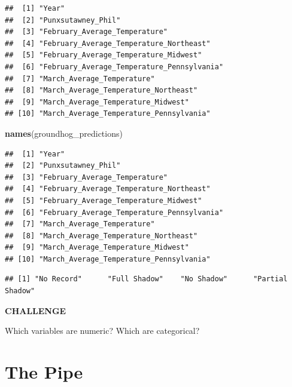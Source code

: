 \documentclass[
]{book}
\newenvironment{Shaded}{\begin{snugshade}}{\end{snugshade}}
\newcommand{\CommentTok}[1]{\textcolor[rgb]{0.56,0.35,0.01}{\textit{#1}}}
\newcommand{\KeywordTok}[1]{\textcolor[rgb]{0.13,0.29,0.53}{\textbf{#1}}}
\newcommand{\NormalTok}[1]{#1}
\newcommand{\OperatorTok}[1]{\textcolor[rgb]{0.81,0.36,0.00}{\textbf{#1}}}
\begin{document}
\begin{verbatim}
##  [1] "Year"                                     
##  [2] "Punxsutawney_Phil"                        
##  [3] "February_Average_Temperature"             
##  [4] "February_Average_Temperature_Northeast"   
##  [5] "February_Average_Temperature_Midwest"     
##  [6] "February_Average_Temperature_Pennsylvania"
##  [7] "March_Average_Temperature"                
##  [8] "March_Average_Temperature_Northeast"      
##  [9] "March_Average_Temperature_Midwest"        
## [10] "March_Average_Temperature_Pennsylvania"
\end{verbatim}

\begin{Shaded}
\begin{Highlighting}[]
\KeywordTok{names}\NormalTok{(groundhog_predictions)}
\end{Highlighting}
\end{Shaded}

\begin{verbatim}
##  [1] "Year"                                     
##  [2] "Punxsutawney_Phil"                        
##  [3] "February_Average_Temperature"             
##  [4] "February_Average_Temperature_Northeast"   
##  [5] "February_Average_Temperature_Midwest"     
##  [6] "February_Average_Temperature_Pennsylvania"
##  [7] "March_Average_Temperature"                
##  [8] "March_Average_Temperature_Northeast"      
##  [9] "March_Average_Temperature_Midwest"        
## [10] "March_Average_Temperature_Pennsylvania"
\end{verbatim}

\begin{Shaded}
\end{Shaded}

\begin{verbatim}
## [1] "No Record"      "Full Shadow"    "No Shadow"      "Partial Shadow"
\end{verbatim}

\textbf{CHALLENGE}

Which variables are numeric? Which are categorical?

\hypertarget{the-pipe}{%
\section{The Pipe}\label{the-pipe}}
\end{document}
